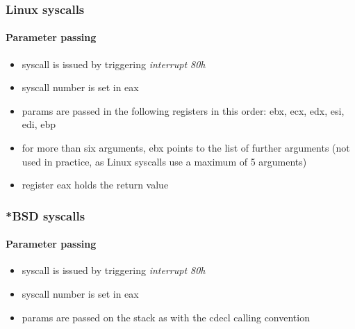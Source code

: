 \subsubsection{Linux syscalls}

\paragraph{Parameter passing}

\begin{itemize}
\item syscall is issued by triggering {\em interrupt 80h}
\item syscall number is set in eax
\item params are passed in the following registers in this order: ebx, ecx, edx, esi, edi, ebp
\item for more than six arguments, ebx points to the list of further arguments (not used in practice, as Linux syscalls use a maximum of 5 arguments)
\item register eax holds the return value
\end{itemize}


\subsubsection{*BSD syscalls}

\paragraph{Parameter passing}

\begin{itemize}
\item syscall is issued by triggering {\em interrupt 80h}
\item syscall number is set in eax
\item params are passed on the stack as with the cdecl calling convention
\end{itemize}

